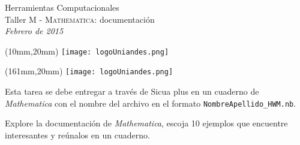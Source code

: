\documentclass[11pt,letterpaper]{exam}
\begin{document}
\begin{center}
{\Large Herramientas Computacionales} \\
Taller M - \textsc{Mathematica}: documentación \\
{\it Febrero de 2015}
\end{center}

\begin{textblock*}{40mm}(10mm,20mm)
  \texttt{[image: logoUniandes.png]}
\end{textblock*}

\begin{textblock*}{40mm}(161mm,20mm)
  \texttt{[image: logoUniandes.png]}
\end{textblock*}

\vspace{0.5cm}

\vspace{0.5cm}

Esta tarea se debe entregar a través de Sicua plus en un cuaderno de {\it Mathematica} con el nombre del archivo en el formato \verb"NombreApellido_HWM.nb". \\

\vspace{0.1cm}

\begin{questions}


Explore la documentación de {\it Mathematica}, escoja 10 ejemplos que encuentre interesantes y reúnalos en un cuaderno.

\end{questions}
\end{document}
